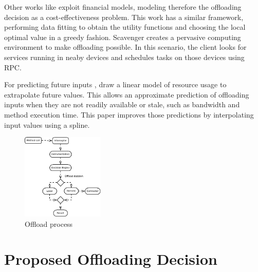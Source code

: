 \documentclass[10pt, conference, letterpaper]{IEEEtran}
\begin{document}
  Other works like \cite{6162380} exploit financial models, modeling therefore the offloading decision as a cost-effectiveness problem. 
  This work has a similar framework, performing data fitting to obtain the utility functions and choosing the local optimal value in a greedy fashion. Scavenger \cite{5466972} creates a pervasive computing environment to make offloading possible. In this scenario, the client looks for services running in neaby devices and schedules tasks on those devices using RPC.

  For predicting future inputs ,\cite{Balan:2003:TRE:1066116.1066125,Cuervo:2010:MMS:1814433.1814441,kosta2012thinkair} draw a linear model of resource usage to extrapolate future values. This allows an approximate prediction of offloading inputs when they are not readily available or stale, such as bandwidth and method execution time. This paper improves those predictions by interpolating input values using a spline.

\begin{figure}[!t]
  \centering
  \includegraphics[width=0.35\textwidth]{imgs/diagram-complete.jpeg}
  \caption{Offload process}
  \label{fig:offloadprocess}
\end{figure}

\section{Proposed Offloading Decision} 
\label{sec:design}
\end{document}
